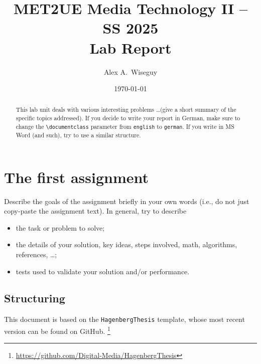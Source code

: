 \documentclass[english,notitlepage,smartquotes]{hgbreport}
\begin{document}

\author{Alex A.\ Wiseguy}                      %
\title{MET2UE Media Technology II -- SS 2025\\ %
				Lab Report }
\date{\today}

\maketitle

\begin{abstract}\noindent
This lab unit deals with various interesting problems \ldots (give a short
summary of the specific topics addressed). If you decide to write your report
in German, make sure to change the \verb!\documentclass! parameter from
\texttt{english} to \texttt{german}. If you write in MS Word (and such), try
to use a similar structure.
\end{abstract}


\section{The first assignment}

Describe the goals of the assignment briefly in your own words (i.e., do not
just copy-paste the assignment text). In general, try to describe
%
\begin{itemize}
	\item the task or problem to solve;
	\item the details of your solution, key ideas, steps involved, math,
	algorithms, references, \ldots;
	\item tests used to validate your solution and/or performance.
\end{itemize}

\subsection{Structuring} %

This \latex document is based on the \texttt{HagenbergThesis} template, whose
most recent version can be found on GitHub.%
\footnote{\url{https://github.com/Digital-Media/HagenbergThesis}}
\end{document}
